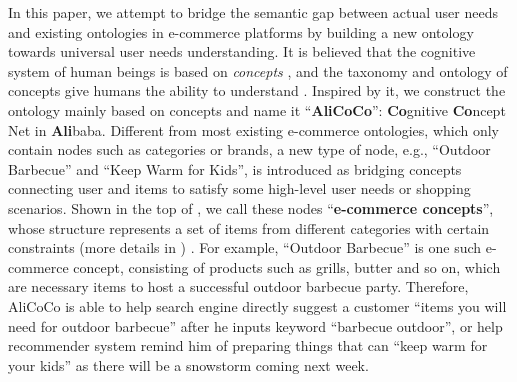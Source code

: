 In this paper, we attempt to bridge the semantic gap between actual user needs and existing ontologies in e-commerce platforms 
by building a new ontology towards universal user needs understanding.
It is believed that the cognitive system of human beings is based on \textit{concepts} \cite{murphy2002thebig,bloom2003glue},
and the taxonomy and ontology of concepts give humans the ability to understand \cite{wu2012probase}.
Inspired by it, we construct the ontology mainly based on concepts and name it ``\textbf{AliCoCo}'': \textbf{Co}gnitive \textbf{Co}ncept Net in \textbf{Ali}baba.
Different from most existing e-commerce ontologies, 
which only contain nodes such as categories or brands, 
a new type of node, e.g.,
``Outdoor Barbecue'' and ``Keep Warm for Kids'', is introduced as 
bridging concepts connecting user and items to satisfy some 
high-level user needs or shopping scenarios. 
Shown in the top of , we call these nodes ``\textbf{e-commerce concepts}'',
whose structure represents a set of items from different categories 
with certain constraints (more details in ) .
For example, ``Outdoor Barbecue'' is one such e-commerce concept,  
consisting of products such as grills, butter and so on, 
which are necessary items to host a successful outdoor barbecue party.
Therefore, AliCoCo is able to help search engine directly suggest a customer 
``items you will need for outdoor barbecue'' 
after he inputs keyword ``barbecue outdoor'',
or help recommender system remind him of preparing things that can ``keep warm for your kids'' as 
there will be a snowstorm coming next week.



